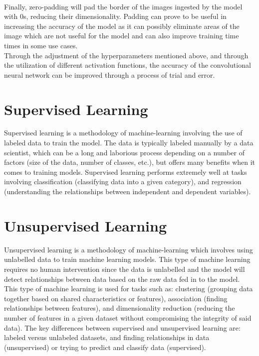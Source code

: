 \\
Finally, zero-padding will pad the border of the images ingested by the model with 0s, reducing their dimensionality. Padding can prove to be useful in increasing the accuracy of the model as it can possibly eliminate areas of the image which are not useful for the model and can also improve training time times in some use cases\cite{zeroPaddingTrainingTime}.
\\
Through the adjustment of the hyperparameters mentioned above, and through the utilization of different activation functions, the accuracy of the convolutional neural network can be improved through a process of trial and error.
\section{Supervised Learning}
Supervised learning is a methodology of machine-learning involving the use of labeled data to train the model\cite{supervisedVsUnsupervised}. The data is typically labeled manually by a data scientist, which can be a long and laborious process depending on a number of factors (size of the data, number of classes, etc.), but offers many benefits when it comes to training models.  Supervised learning performs extremely well at tasks involving classification (classifying data into a given category), and regression (understanding the relationships between independent and dependent variables). 
\section{Unsupervised Learning}
Unsupervised learning is a methodology of machine-learning which involves using unlabelled data to train machine learning models\cite{supervisedVsUnsupervised}.  This type of machine learning requires no human intervention since the data is unlabelled and the model will detect relationships between data based on the raw data fed in to the model.  This type of machine learning is used for tasks such as: clustering (grouping data together based on shared characteristics or features), association (finding relationships between features), and dimensionality reduction (reducing the number of features in a given dataset without compromising the integrity of said data).  The key differences between supervised and unsupervised learning are: labeled versus unlabeled datasets, and finding relationships in data (unsupervised) or trying to predict and classify data (supervised).

